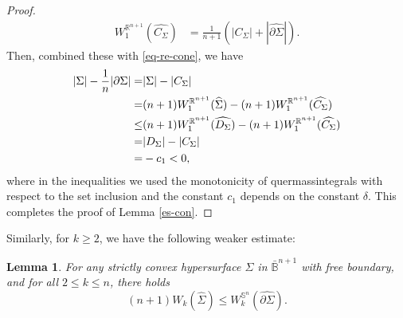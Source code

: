 \documentclass[11pt,reqno]{amsart}
\newtheorem{lem}[thm]{Lemma}
\theoremstyle{definition}
\theoremstyle{remark}
\numberwithin{equation}{section}
\renewcommand{\(}{\left(}
\renewcommand{\)}{\right)}
\renewcommand{\-}{\overline}
\begin{document}
\begin{proof}
\begin{align}
	W_1^{\mathbb{R}^{n+1}}(\widehat{C_{\Sigma}})&=\frac{1}{n+1}(|C_{\Sigma}|+|\widehat{\partial\Sigma}|).\label{W_1CSigma}
\end{align}
Then, combined these with \eqref{eq-re-cone}, we have
\begin{align}
	|\Sigma|-\frac{1}{n}|\partial\Sigma|=&|\Sigma|-|C_{\Sigma}|\notag\\
	=&(n+1)W_1^{\mathbb{R}^{n+1}}(\widehat{\Sigma})-(n+1)W_1^{\mathbb{R}^{n+1}}(\widehat{C_{\Sigma}})\notag\\
	\leq&(n+1)W_1^{\mathbb{R}^{n+1}}(\widehat{D_{\Sigma}})-(n+1)W_1^{\mathbb{R}^{n+1}}(\widehat{C_{\Sigma}})\notag\\
	=&|D_{\Sigma}|-|C_{\Sigma}|\notag\\
	=&-c_1<0,
\end{align}
where in the inequalities we used the monotonicity of quermassintegrals with respect to the set inclusion and the constant $c_1$ depends on the constant $\delta$. This completes the proof of Lemma \ref{es-con}.
\end{proof}
Similarly, for $k\geq 2$, we have the following weaker estimate:
\begin{lem}\label{Lem-con1}
		For any strictly convex hypersurface $\Sigma$ in $\bar{\mathbb{B}}^{n+1}$ with free boundary, and for all $2\leq k\leq n$, there holds
		\begin{equation}
			(n+1)W_k(\widehat{\Sigma})\leq W_k^{\mathbb{S}^n}(\widehat{\partial\Sigma}).
		\end{equation}
\end{lem}
\end{document}
